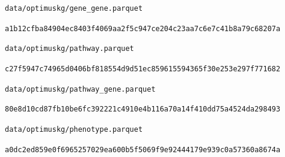 \documentclass[10pt,a4paper]{article}
\begin{document}
\smallskip
\noindent\nolinkurl{data/optimuskg/gene_gene.parquet}\par
\noindent\texttt{a1b12cfba84904ec8403f4069aa2f5c947ce204c23aa7c6e7c41b8a79c68207a}\par
\smallskip
\noindent\nolinkurl{data/optimuskg/pathway.parquet}\par
\noindent\texttt{c27f5947c74965d0406bf818554d9d51ec859615594365f30e253e297f771682}\par
\smallskip
\noindent\nolinkurl{data/optimuskg/pathway_gene.parquet}\par
\noindent\texttt{80e8d10cd87fb10be6fc392221c4910e4b116a70a14f410dd75a4524da298493}\par
\smallskip
\noindent\nolinkurl{data/optimuskg/phenotype.parquet}\par
\noindent\texttt{a0dc2ed859e0f6965257029ea600b5f5069f9e92444179e939c0a57360a8674a}\par
\smallskip
\endgroup
\end{document}
